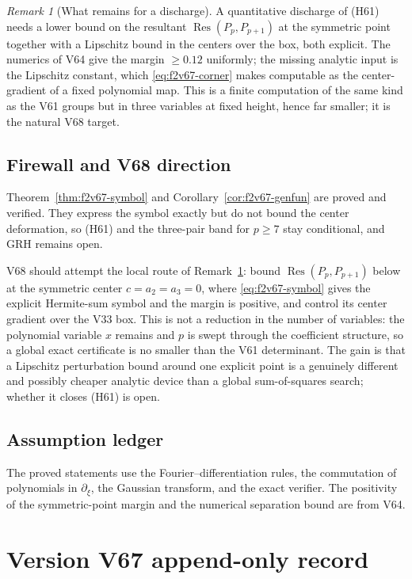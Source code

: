 \documentclass[11pt]{article}
\theoremstyle{definition}
\theoremstyle{remark}
\newtheorem{remark}[theorem]{Remark}
\begin{document}
\begin{remark}[What remains for a discharge]
\label{rem:f2v67-remains}
A quantitative discharge of (H61) needs a lower bound on the resultant
\(\operatorname{Res}(P_p,P_{p+1})\) at the symmetric point together with a
Lipschitz bound in the centers over the box, both explicit.  The
numerics of V64 give the margin \(\ge0.12\) uniformly; the missing
analytic input is the Lipschitz constant, which
\eqref{eq:f2v67-corner} makes computable as the center-gradient of a
fixed polynomial map.  This is a finite computation of the same kind as
the V61 groups but in three variables at fixed height, hence far smaller;
it is the natural V68 target.
\end{remark}

\subsection*{Firewall and V68 direction}
\label{fire:f2v67}
Theorem~\ref{thm:f2v67-symbol} and Corollary~\ref{cor:f2v67-genfun} are
proved and verified.  They express the symbol exactly but do not bound
the center deformation, so (H61) and the three-pair band for \(p\ge7\)
stay conditional, and GRH remains open.

V68 should attempt the local route of
Remark~\ref{rem:f2v67-remains}: bound
\(\operatorname{Res}(P_p,P_{p+1})\) below at the symmetric center
\(c=a_2=a_3=0\), where \eqref{eq:f2v67-symbol} gives the explicit
Hermite-sum symbol and the margin is positive, and control its center
gradient over the V33 box.  This is not a reduction in the number of
variables: the polynomial variable \(x\) remains and \(p\) is swept
through the coefficient structure, so a global exact certificate is no
smaller than the V61 determinant.  The gain is that a Lipschitz
perturbation bound around one explicit point is a genuinely different and
possibly cheaper analytic device than a global sum-of-squares search;
whether it closes (H61) is open.

\subsection*{Assumption ledger}
\label{ass:f2v67}
The proved statements use the Fourier--differentiation rules, the
commutation of polynomials in \(\partial_\xi\), the Gaussian transform,
and the exact verifier.  The positivity of the symmetric-point margin and
the numerical separation bound are from V64.
\endgroup

\section*{Version V67 append-only record}
\end{document}
